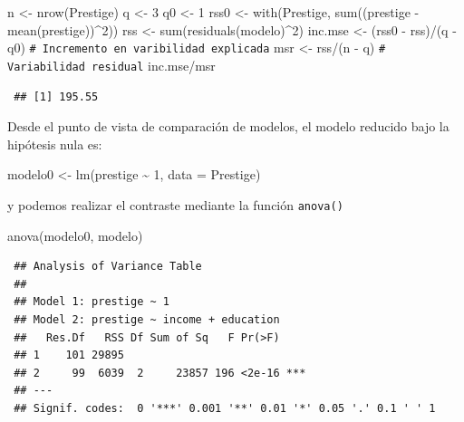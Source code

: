 \documentclass[
  10pt,
]{book}
\newenvironment{Shaded}{\begin{snugshade}}{\end{snugshade}}
\newcommand{\AttributeTok}[1]{\textcolor[rgb]{0.77,0.63,0.00}{#1}}
\newcommand{\CommentTok}[1]{\textcolor[rgb]{0.56,0.35,0.01}{\textit{#1}}}
\newcommand{\DecValTok}[1]{\textcolor[rgb]{0.00,0.00,0.81}{#1}}
\newcommand{\FunctionTok}[1]{\textcolor[rgb]{0.00,0.00,0.00}{#1}}
\newcommand{\NormalTok}[1]{#1}
\newcommand{\OtherTok}[1]{\textcolor[rgb]{0.56,0.35,0.01}{#1}}
\newcommand{\SpecialCharTok}[1]{\textcolor[rgb]{0.00,0.00,0.00}{#1}}
\theoremstyle{break}
\theoremstyle{nonumberplain}
\renewcommand{\CommentTok}[1]{\textcolor[rgb]{0.41,0.41,0.41}{\texttt{#1}}}
\begin{document}
\begin{Shaded}
\begin{Highlighting}[]
\NormalTok{n }\OtherTok{\textless{}{-}} \FunctionTok{nrow}\NormalTok{(Prestige)}
\NormalTok{q }\OtherTok{\textless{}{-}} \DecValTok{3}
\NormalTok{q0 }\OtherTok{\textless{}{-}} \DecValTok{1}
\NormalTok{rss0 }\OtherTok{\textless{}{-}} \FunctionTok{with}\NormalTok{(Prestige, }\FunctionTok{sum}\NormalTok{((prestige }\SpecialCharTok{{-}} \FunctionTok{mean}\NormalTok{(prestige))}\SpecialCharTok{\^{}}\DecValTok{2}\NormalTok{))}
\NormalTok{rss }\OtherTok{\textless{}{-}} \FunctionTok{sum}\NormalTok{(}\FunctionTok{residuals}\NormalTok{(modelo)}\SpecialCharTok{\^{}}\DecValTok{2}\NormalTok{)}
\NormalTok{inc.mse }\OtherTok{\textless{}{-}}\NormalTok{ (rss0 }\SpecialCharTok{{-}}\NormalTok{ rss)}\SpecialCharTok{/}\NormalTok{(q }\SpecialCharTok{{-}}\NormalTok{ q0)  }\CommentTok{\# Incremento en varibilidad explicada}
\NormalTok{msr }\OtherTok{\textless{}{-}}\NormalTok{  rss}\SpecialCharTok{/}\NormalTok{(n }\SpecialCharTok{{-}}\NormalTok{ q)               }\CommentTok{\# Variabilidad residual}
\NormalTok{inc.mse}\SpecialCharTok{/}\NormalTok{msr}
\end{Highlighting}
\end{Shaded}

\begin{verbatim}
 ## [1] 195.55
\end{verbatim}

Desde el punto de vista de comparación de modelos, el modelo
reducido bajo la hipótesis nula es:

\begin{Shaded}
\begin{Highlighting}[]
\NormalTok{modelo0 }\OtherTok{\textless{}{-}} \FunctionTok{lm}\NormalTok{(prestige }\SpecialCharTok{\textasciitilde{}} \DecValTok{1}\NormalTok{, }\AttributeTok{data =}\NormalTok{ Prestige)}
\end{Highlighting}
\end{Shaded}

y podemos realizar el contraste mediante la función \texttt{anova()}

\begin{Shaded}
\begin{Highlighting}[]
\FunctionTok{anova}\NormalTok{(modelo0, modelo)}
\end{Highlighting}
\end{Shaded}

\begin{verbatim}
 ## Analysis of Variance Table
 ## 
 ## Model 1: prestige ~ 1
 ## Model 2: prestige ~ income + education
 ##   Res.Df   RSS Df Sum of Sq   F Pr(>F)    
 ## 1    101 29895                            
 ## 2     99  6039  2     23857 196 <2e-16 ***
 ## ---
 ## Signif. codes:  0 '***' 0.001 '**' 0.01 '*' 0.05 '.' 0.1 ' ' 1
\end{verbatim}
\end{document}
